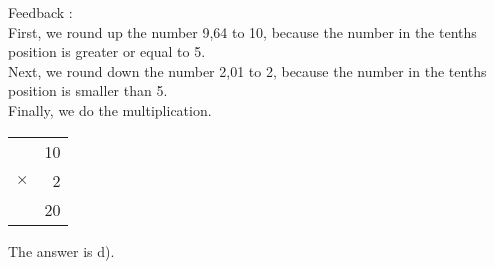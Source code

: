\documentclass[letterpaper, 12pt]{article}
\begin{document}
Feedback :\\
First, we round up the number 9,64 to 10, because the number in the tenths position is greater or equal to 5.\\

Next, we round down the number 2,01 to 2, because the number in the tenths position is smaller than 5.\\

Finally, we do the multiplication.\\

\begin{center}
 \begin{tabular}{r r}
 & 10\\
$\times$ & 2\\
\hline
 & 20
\end{tabular}
\end{center}
The answer is d).\\
\end{document}
